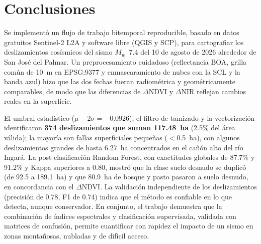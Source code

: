 \documentclass[12pt]{article}
\begin{document}
\section{Conclusiones}
Se implementó un flujo de trabajo bitemporal reproducible, basado en datos gratuitos Sentinel-2 L2A y software libre (QGIS y SCP), para cartografiar los deslizamientos cosísmicos del sismo $M_w$~7.4 del 10 de agosto de 2026 alrededor de San José del Palmar. Un preprocesamiento cuidadoso (reflectancia BOA, grilla común de 10~m en EPSG:9377 y enmascaramiento de nubes con la SCL y la banda azul) hizo que las dos fechas fueran radiométrica y geométricamente comparables, de modo que las diferencias de $\Delta$NDVI y $\Delta$NIR reflejan cambios reales en la superficie.

El umbral estadístico ($\mu - 2\sigma = -0.0926$), el filtro de tamizado y la vectorización identificaron \textbf{374 deslizamientos que suman 117.48~ha} (2.5\% del área válida); la mayoría son fallas superficiales pequeñas ($<$0.5~ha), con algunos deslizamientos grandes de hasta 6.27~ha concentrados en el cañón alto del río Ingará. La post-clasificación Random Forest, con exactitudes globales de 87.7\% y 91.2\% y Kappa superiores a 0.80, mostró que la clase suelo desnudo se duplicó (de 92.5 a 189.1~ha) y que 80.9~ha de bosque y pasto pasaron a suelo desnudo, en concordancia con el $\Delta$NDVI. La validación independiente de los deslizamientos (precisión de 0.78, F1 de 0.74) indica que el método es confiable en lo que detecta, aunque conservador. En conjunto, el trabajo demuestra que la combinación de índices espectrales y clasificación supervisada, validada con matrices de confusión, permite cuantificar con rapidez el impacto de un sismo en zonas montañosas, nubladas y de difícil acceso.

\printbibliography[title={Referencias}]
\end{document}
